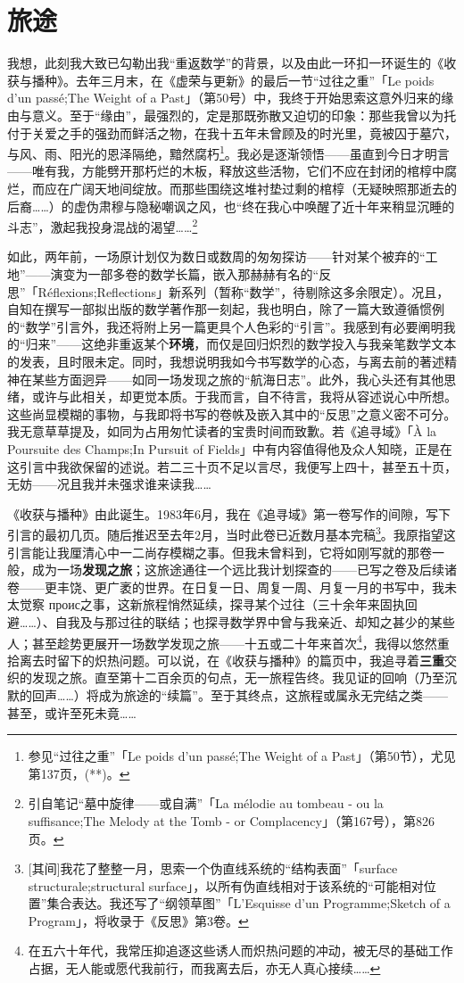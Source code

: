 \section{旅途}

我想，此刻我大致已勾勒出我“重返数学”的背景，以及由此一环扣一环诞生的《收获与播种》。去年三月末，在《虚荣与更新》的最后一节“过往之重”「Le poids d'un passé;The Weight of a Past」（第50号）中，我终于开始思索这意外归来的缘由与意义。至于“缘由”，最强烈的，定是那既弥散又迫切的印象：那些我曾以为托付于关爱之手的强劲而鲜活之物，在我十五年未曾顾及的时光里，竟被囚于墓穴，与风、雨、阳光的恩泽隔绝，黯然腐朽\footnote{参见“过往之重”「Le poids d'un passé;The Weight of a Past」（第50节），尤见第137页，(**)。}。我必是逐渐领悟——虽直到今日才明言——唯有我，方能劈开那朽烂的木板，释放这些活物，它们不应在封闭的棺椁中腐烂，而应在广阔天地间绽放。而那些围绕这堆衬垫过剩的棺椁（无疑映照那逝去的后裔……）的虚伪肃穆与隐秘嘲讽之风，也“终在我心中唤醒了近十年来稍显沉睡的斗志”，激起我投身混战的渴望……\footnote{引自笔记“墓中旋律——或自满”「La mélodie au tombeau - ou la suffisance;The Melody at the Tomb - or Complacency」（第167号），第826页。}

如此，两年前，一场原计划仅为数日或数周的匆匆探访——针对某个被弃的“工地”——演变为一部多卷的数学长篇，嵌入那赫赫有名的“反思”「Réflexions;Reflections」新系列（暂称“数学”，待剔除这多余限定）。况且，自知在撰写一部拟出版的数学著作那一刻起，我也明白，除了一篇大致遵循惯例的“数学”引言外，我还将附上另一篇更具个人色彩的“引言”。我感到有必要阐明我的“归来”——这绝非重返某个\textbf{环境}，而仅是回归炽烈的数学投入与我亲笔数学文本的发表，且时限未定。同时，我想说明我如今书写数学的心态，与离去前的著述精神在某些方面迥异——如同一场发现之旅的“航海日志”。此外，我心头还有其他思绪，或许与此相关，却更觉本质。于我而言，自不待言，我将从容述说心中所想。这些尚显模糊的事物，与我即将书写的卷帙及嵌入其中的“反思”之意义密不可分。我无意草草提及，如同为占用匆忙读者的宝贵时间而致歉。若《追寻域》「À la Poursuite des Champs;In Pursuit of Fields」中有内容值得他及众人知晓，正是在这引言中我欲保留的述说。若二三十页不足以言尽，我便写上四十，甚至五十页，无妨——况且我并未强求谁来读我……

《收获与播种》由此诞生。1983年6月，我在《追寻域》第一卷写作的间隙，写下引言的最初几页。随后推迟至去年2月，当时此卷已近数月基本完稿\footnote{[其间]我花了整整一月，思索一个伪直线系统的“结构表面”「surface structurale;structural surface」，以所有伪直线相对于该系统的“可能相对位置”集合表达。我还写了“纲领草图”「L'Esquisse d'un Programme;Sketch of a Program」，将收录于《反思》第3卷。}。我原指望这引言能让我厘清心中一二尚存模糊之事。但我未曾料到，它将如刚写就的那卷一般，成为一场\textbf{发现之旅}；这旅途通往一个远比我计划探查的——已写之卷及后续诸卷——更丰饶、更广袤的世界。在日复一日、周复一周、月复一月的书写中，我未太觉察 проис之事，这新旅程悄然延续，探寻某个过往（三十余年来固执回避……）、自我及与那过往的联结；也探寻数学界中曾与我亲近、却知之甚少的某些人；甚至趁势更展开一场数学发现之旅——十五或二十年来首次\footnote{在五六十年代，我常压抑追逐这些诱人而炽热问题的冲动，被无尽的基础工作占据，无人能或愿代我前行，而我离去后，亦无人真心接续……}，我得以悠然重拾离去时留下的炽热问题。可以说，在《收获与播种》的篇页中，我追寻着\textbf{三重}交织的发现之旅。直至第十二百余页的句点，无一旅程告终。我见证的回响（乃至沉默的回声……）将成为旅途的“续篇”。至于其终点，这旅程或属永无完结之类——甚至，或许至死未竟……

